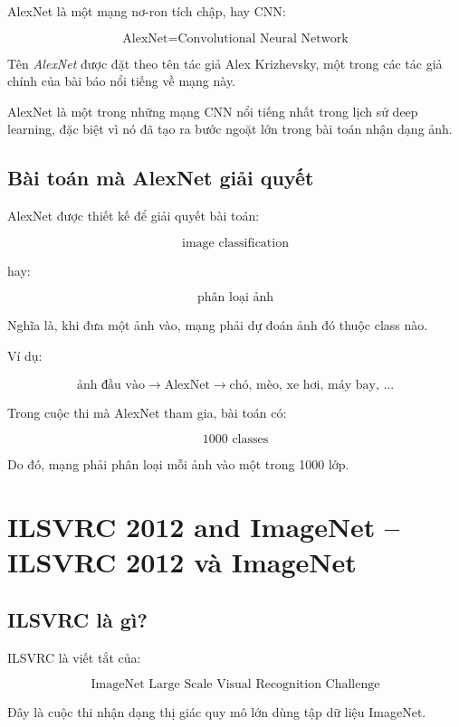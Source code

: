 AlexNet là một mạng nơ-ron tích chập, hay CNN:

\[
    \text{AlexNet} = \text{Convolutional Neural Network}
\]

Tên \textit{AlexNet} được đặt theo tên tác giả Alex Krizhevsky, một trong các tác giả chính của bài báo nổi tiếng về mạng này.

\begin{ghinho}
AlexNet là một trong những mạng CNN nổi tiếng nhất trong lịch sử deep learning, đặc biệt vì nó đã tạo ra bước ngoặt lớn trong bài toán nhận dạng ảnh.
\end{ghinho}

\subsection{Bài toán mà AlexNet giải quyết}

AlexNet được thiết kế để giải quyết bài toán:

\[
    \text{image classification}
\]

hay:

\[
    \text{phân loại ảnh}
\]

Nghĩa là, khi đưa một ảnh vào, mạng phải dự đoán ảnh đó thuộc class nào.

Ví dụ:

\[
    \text{ảnh đầu vào}
    \rightarrow
    \text{AlexNet}
    \rightarrow
    \text{chó, mèo, xe hơi, máy bay, ...}
\]

Trong cuộc thi mà AlexNet tham gia, bài toán có:

\[
    1000 \text{ classes}
\]

Do đó, mạng phải phân loại mỗi ảnh vào một trong 1000 lớp.

\section{ILSVRC 2012 and ImageNet -- ILSVRC 2012 và ImageNet}

\subsection{ILSVRC là gì?}

ILSVRC là viết tắt của:

\[
    \text{ImageNet Large Scale Visual Recognition Challenge}
\]

Đây là cuộc thi nhận dạng thị giác quy mô lớn dùng tập dữ liệu ImageNet.

